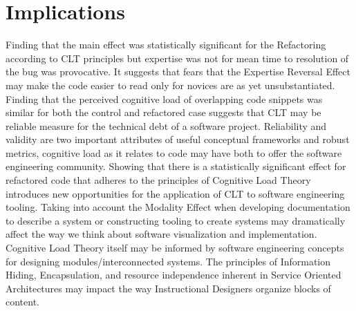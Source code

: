\chapter{Implications}

Finding that the main effect was statistically significant for the Refactoring according to CLT principles but expertise was not for mean time to resolution of the bug was provocative. It suggests that fears that the Expertise Reversal Effect may make the code easier to read only for novices are as yet unsubstantiated. Finding that the perceived cognitive load of overlapping code snippets was similar for both the control and refactored case suggests that CLT may be reliable measure for the technical debt of a software project. Reliability and validity are two important attributes of useful conceptual frameworks and robust metrics, cognitive load as it relates to code may have both to offer the software engineering community. Showing that there is a statistically significant effect for refactored code that adheres to the principles of Cognitive Load Theory introduces new opportunities for the application of CLT to software engineering tooling. Taking into account the Modality Effect when developing documentation to describe a system or constructing tooling to create systems may dramatically affect the way we think about software visualization and implementation. Cognitive Load Theory itself may be informed by software engineering concepts for designing modules/interconnected systems. The principles of Information Hiding, Encapsulation, and resource independence inherent in Service Oriented Architectures may impact the way Instructional Designers organize blocks of content.
